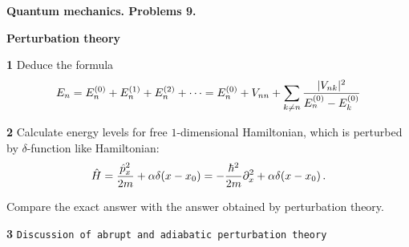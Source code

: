 \baselineskip=14pt
\def\vare {\varepsilon}
\def\A {{\bf A}}
\def\t {\tilde}
\def\a {\alpha}
\def\K {{\bf K}}
\def\N {{\bf N}}
\def\V {{\cal V}}
\def\s {{\sigma}}
\def\S {{\Sigma}}
\def\s {{\sigma}}
\def\p{\partial}
\def\vare{{\varepsilon}}
\def\Q {{\bf Q}}
\def\D {{\cal D}}
\def\G {{\Gamma}}
\def\C {{\bf C}}
\def\M {{\cal M}}
\def\Z {{\bf Z}}
\def\U  {{\cal U}}
\def\H {{\cal H}}
\def\R  {{\bf R}}
\def\S  {{\bf S}}
\def\E  {{\bf E}}
\def\l {\lambda}
\def\ll {{\bf l}}
\def\degree {{\bf {\rm degree}\,\,}}
\def \finish {${\,\,\vrule height1mm depth2mm width 8pt}$}
\def \m {\medskip}
\def\p {\partial}
\def\r {{\bf r}}
\def\pt {{\bf p}}
\def\v {{\bf v}}
\def\n {{\bf n}}
\def\t {{\bf t}}
\def\b {{\bf b}}
\def\c {{\bf c }}
\def\e{{\bf e}}
\def\ac {{\bf a}}
\def \X   {{\bf X}}
\def \Y   {{\bf Y}}
\def \x   {{\bf x}}
\def \y   {{\bf y}}
\def \z   {{\bf z}}
\def \G{{\cal G}}
\def\w {{\omega}}
\def \Tr  {{\rm Tr\,}}
\def\V {{\cal V}}
\def\H {{\cal H}}


\centerline {\bf Quantum mechanics. Problems 9.}

\centerline {\bf Perturbation theory}



{\bf 1}   Deduce the formula
                 $$
E_{n}=
 E_{n}^{(0)}+
 E_{n}^{(1)}+
 E_{n}^{(2)}+\dots=
 E_{n}^{(0)}+
                V_{nn}+
           \sum_{k\not =n}{|V_{nk}|^2\over 
          E^{(0)}_{n}-E^{(0)}_{k}}
                 $$

\m


{\bf 2}    Calculate energy levels for free $1$-dimensional Hamiltonian,
which is perturbed by $\delta$-function like Hamiltonian:
                $$
   \hat H={\hat p_x^2\over 2m}+\a \delta (x-x_0)=
      -{\hbar ^2\over 2m}\p_x^2+\a \delta (x-x_0)\,.
                   $$

Compare the exact answer with the answer obtained by perturbation theory.


\m

{\bf 3}    {\tt Discussion of abrupt and adiabatic perturbation theory}


\bye

